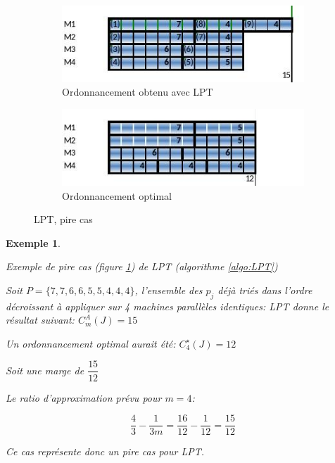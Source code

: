 \documentclass[a4paper,12pt]{report}
\theoremstyle{plain}				%
\newtheorem{example}{Exemple}
\theoremstyle{definition}				%
\begin{document}
\begin{figure}
{\centering}
	\begin{subfigure}[b]{0.45\linewidth}
    \includegraphics[width=\linewidth]
    {Biblio_PCmax_Rendu_exLPT_Rev1.jpg}
    \caption{Ordonnancement obtenu avec LPT}
  	\end{subfigure}
\hfill%
	\begin{subfigure}[b]{0.45\linewidth}
    \includegraphics[width=\linewidth]
    {Biblio_PCmax_Rendu_exLPT_Rev2.jpg}
    \caption{Ordonnancement optimal}
  	\end{subfigure}
  	\caption{LPT, pire cas}
  	\label{fig:LPTExemplePireCas}
\end{figure}

\begin{example}
\begin{flushleft}
Exemple de pire cas (figure \ref{fig:LPTExemplePireCas}) de LPT (algorithme \ref{algo:LPT})

Soit $P=\{7,7,6,6,5,5,4,4,4\}$, l'ensemble des $p_j$ déjà triés dans
l'ordre décroissant à appliquer sur 4 machines parallèles identiques:
\bigskip
LPT donne le résultat suivant: $C_m^A(J) = 15$
\bigskip

Un ordonnancement optimal aurait été: $C_4^{\star}(J)=12$

Soit une marge de $\dfrac{15}{12}$

Le ratio d'approximation prévu pour $m=4$:

\[
  \dfrac{4}{3} - \dfrac{1}{3m}=\dfrac{16}{12} - \dfrac{1}{12}=\dfrac{15}{12}
\]

Ce cas représente donc un pire cas pour LPT.
\end{flushleft}
\label{ex:LPTExemplePireCas}
\end{example}
\end{document}
